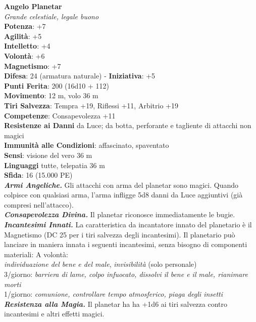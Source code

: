 \begin{multicols}{2}
\medskip\textbf{Angelo Planetar}\\
\emph{Grande celestiale, legale buono}\\
\textbf{Potenza}: +7\\
\textbf{Agilità}: +5\\
\textbf{Intelletto}: +4\\
\textbf{Volontà}: +6\\
\textbf{Magnetismo}: +7\\
\textbf{Difesa}: 24 (armatura naturale) - \textbf{Iniziativa}: +5\\
\textbf{Punti Ferita}: 200 (16d10 + 112)\\
\textbf{Movimento}: 12 m, volo 36 m\\
\textbf{Tiri Salvezza}: Tempra +19, Riflessi +11, Arbitrio +19\\
\textbf{Competenze}: Consapevolezza +11\\
\textbf{Resistenze ai Danni} da Luce; da botta, perforante e tagliente di attacchi non magici\\
\textbf{Immunità alle Condizioni}: affascinato, spaventato\\
\textbf{Sensi}: visione del vero 36 m\\
\textbf{Linguaggi} tutte, telepatia 36 m\\
\textbf{Sfida}: 16 (15.000 PE)\smallskip\\
\emph{\textbf{Armi Angeliche.}} Gli attacchi con arma del planetar sono magici. Quando colpisce con qualsiasi arma, l'arma infligge 5d8 danni da Luce aggiuntivi (già compresi nell'attacco).\\
\emph{\textbf{Consapevolezza Divina.}} Il planetar riconosce immediatamente le bugie.\\
\emph{\textbf{Incantesimi Innati.}} La caratteristica da incantatore innato del planetario è il Magnetismo (DC  25 per i tiri salvezza degli incantesimi). Il planetario può lanciare in maniera innata i seguenti incantesimi, senza bisogno di componenti materiali: A volontà:\\
\emph{individuazione del bene e del male}, \emph{invisibilità} (solo personale)\\
3/giorno: \emph{barriera di lame, colpo infuocato, dissolvi il bene e il} \emph{male, rianimare morti}\\
1/giorno: \emph{comunione, controllare tempo atmosferico, piaga degli insetti}\\
\emph{\textbf{Resistenza alla Magia.}} Il planetar ha ha +1d6 ai tiri salvezza contro incantesimi e altri effetti magici.\\

\end{multicols}
